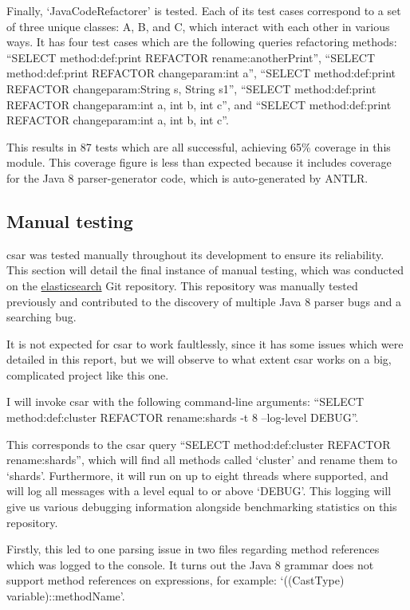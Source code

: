 \documentclass[12pt, letterpaper]{article}
\begin{document}
Finally, `JavaCodeRefactorer' is tested.
Each of its test cases correspond to a set of three unique classes: A, B, and C, which interact with each other in various ways.
It has four test cases which are the following queries refactoring methods: ``SELECT method:def:print REFACTOR rename:anotherPrint'', ``SELECT method:def:print REFACTOR changeparam:int a'', ``SELECT method:def:print REFACTOR changeparam:String s, String s1'', ``SELECT method:def:print REFACTOR changeparam:int a, int b, int c'', and ``SELECT method:def:print REFACTOR changeparam:int a, int b, int c''.

This results in 87 tests which are all successful, achieving 65\% coverage in this module.
This coverage figure is less than expected because it includes coverage for the Java 8 parser-generator code, which is auto-generated by ANTLR.

\subsection{Manual testing}
csar was tested manually throughout its development to ensure its reliability.
This section will detail the final instance of manual testing, which was conducted on the \href{https://github.com/elastic/elasticsearch}{elasticsearch} Git repository.
This repository was manually tested previously and contributed to the discovery of multiple Java 8 parser bugs and a searching bug.

It is not expected for csar to work faultlessly, since it has some issues which were detailed in this report, but we will observe to what extent csar works on a big, complicated project like this one.

I will invoke csar with the following command-line arguments: ``SELECT method:def:cluster REFACTOR rename:shards -t 8 --log-level DEBUG''.

This corresponds to the csar query ``SELECT method:def:cluster REFACTOR rename:shards'', which will find all methods called `cluster' and rename them to `shards'.
Furthermore, it will run on up to eight threads where supported, and will log all messages with a level equal to or above `DEBUG'.
This logging will give us various debugging information alongside benchmarking statistics on this repository.

Firstly, this led to one parsing issue in two files regarding method references which was logged to the console.
It turns out the Java 8 grammar does not support method references on expressions, for example: `((CastType) variable)::methodName'.
\end{document}
